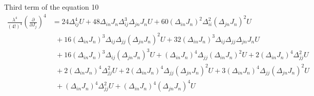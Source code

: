 \documentclass[12pt, letterpaper]{article}
\newcommand*{\1}{\hspace{1pt}}
\begin{document}
     Third term of the equation 10 
     \begin{align*}
        \frac{\lambda ^4}{(4!)^4}(\frac{\partial}{\partial J_{j}})^{4} &  = 24\Delta_{ij}^{4}U + 48\Delta_{in}J_{n}\Delta_{ij}^{3}\Delta_{jn}J_{n}U + 60(\Delta_{in}J_{n})^{2}\Delta_{ii}^{2}(\Delta_{jn}J_{n})^{2}U \\ 
        & \ \  + 16(\Delta_{in}J_{n})^{3}\Delta_{ij}\Delta_{jj}(\Delta_{jn}J_{n})^{2}U + 32(\Delta_{in}J_{n})^{3}\Delta_{ij}\Delta_{jj}\Delta_{jn}J_{n}U \\ 
        & \ \  + 16(\Delta_{in}J_{n})^{3}\Delta_{ij}(\Delta_{jn}J_{n})^{3}U + (\Delta_{in}J_{n})^{4}\Delta_{jj}(\Delta_{in}J_{n})^{2}U + 2(\Delta_{in}J_{n})^{4}\Delta_{jj}^{2}U \\ 
        & \ \  + 2(\Delta_{in}J_{n})^{4}\Delta_{jj}^{2}U + 2(\Delta_{in}J_{n})^{4}\Delta_{jj}(\Delta_{jn}J_{n})^{2}U + 3(\Delta_{in}J_{n})^{4}\Delta_{jj}(\Delta_{jn}J_{n})^{2}U \\ 
        & \ \  + (\Delta_{in}J_{n})^{4}\Delta_{jj}^{2}U + (\Delta_{in}J_{n})^{4}(\Delta_{jn}J_{n})^{4}U
     \end{align*}
\end{document}
